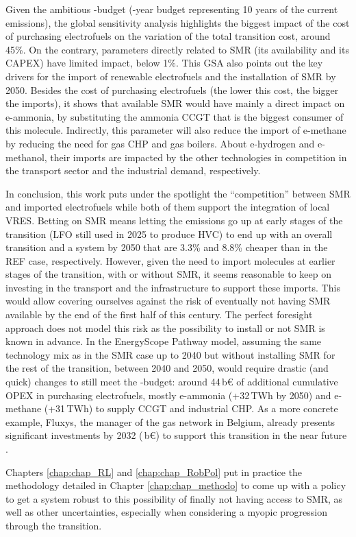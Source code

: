 Given the ambitious -budget (-year budget representing 10 years of the current emissions), the global sensitivity analysis highlights the biggest impact of the cost of purchasing electrofuels on the variation of the total transition cost, around 45\%. On the contrary, parameters directly related to \gls{SMR} (\ie its availability and its CAPEX) have limited impact, below 1\%. This \gls{GSA} also points out the key drivers for the import of renewable electrofuels and the installation of \gls{SMR} by 2050. Besides the cost of purchasing electrofuels (\ie the lower this cost, the bigger the imports), it shows that available \gls{SMR} would have mainly a direct impact on e-ammonia, by substituting the ammonia \gls{CCGT} that is the biggest consumer of this molecule. Indirectly, this parameter will also reduce the import of e-methane by reducing the need for gas \gls{CHP} and gas boilers. About e-hydrogen and e-methanol, their imports are impacted by the other technologies in competition in the transport sector and the industrial demand, respectively.

In conclusion, this work puts under the spotlight the ``competition'' between \gls{SMR} and imported electrofuels while both of them support the integration of local \gls{VRES}. Betting on \gls{SMR} means letting the emissions go up at early stages of the transition (\ie \gls{LFO} still used in 2025 to produce \gls{HVC}) to end up with an overall transition and a system by 2050 that are 3.3\% and 8.8\% cheaper than in the REF case, respectively. However, given the need to import molecules at earlier stages of the transition, with or without \gls{SMR}, it seems reasonable to keep on investing in the transport and the infrastructure to support these imports. This would allow covering ourselves against the risk of eventually not having \gls{SMR} available by the end of the first half of this century. The perfect foresight approach does not model this risk as the possibility to install or not \gls{SMR} is known in advance. In the EnergyScope Pathway model, assuming the same technology mix as in the SMR case up to 2040 but without installing \gls{SMR} for the rest of the transition, \ie between 2040 and 2050, would require drastic (and quick) changes to still meet the -budget: around 44\,b€ of additional cumulative OPEX in purchasing electrofuels, mostly e-ammonia (+32\,TWh by 2050) and e-methane (+31\,TWh) to supply \gls{CCGT} and industrial \gls{CHP}. As a more concrete example, Fluxys, the manager of the gas network in Belgium, already presents significant investments by 2032 (\,b€) to support this transition in the near future \cite{Fluxys_2023}. 

Chapters \ref{chap:chap_RL} and \ref{chap:chap_RobPol} put in practice the methodology detailed in Chapter \ref{chap:chap_methodo} to come up with a policy to get a system robust to this possibility of finally not having access to \gls{SMR}, as well as other uncertainties, especially when considering a myopic progression through the transition.